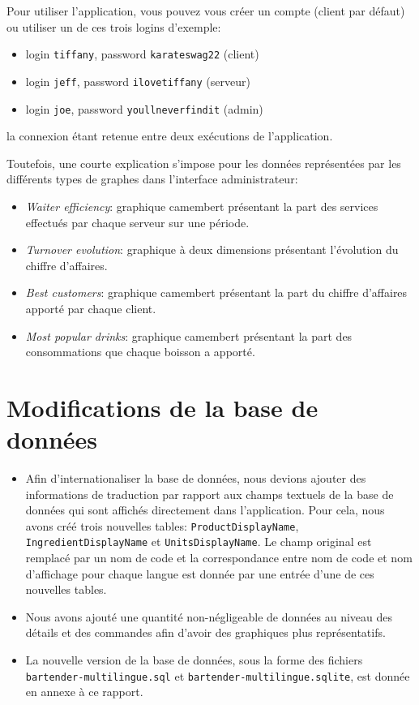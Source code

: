 \documentclass[a4paper,10pt]{article}
\begin{document}
Pour utiliser l'application, vous pouvez vous créer un compte (client par défaut) ou utiliser un de ces trois logins d'exemple:
\begin{itemize}
    \item login \texttt{tiffany}, password \texttt{karateswag22} (client)
    \item login \texttt{jeff}, password \texttt{ilovetiffany} (serveur)
    \item login \texttt{joe}, password \texttt{youllneverfindit} (admin)
\end{itemize}
la connexion étant retenue entre deux exécutions de l'application.

Toutefois, une courte explication s'impose pour les données représentées par les différents types de graphes dans l'interface administrateur:
\begin{itemize}
    \item \emph{Waiter efficiency}: graphique camembert présentant la part des services effectués par chaque serveur sur une période.
    \item \emph{Turnover evolution}: graphique à deux dimensions présentant l'évolution du chiffre d'affaires.
    \item \emph{Best customers}: graphique camembert présentant la part du chiffre d'affaires apporté par chaque client.
    \item \emph{Most popular drinks}: graphique camembert présentant la part des consommations que chaque boisson a apporté.
\end{itemize}

\section{Modifications de la base de données}

\begin{itemize}
    \item Afin d'internationaliser la base de données, nous devions ajouter des informations de traduction par rapport aux champs textuels de la base de données qui sont affichés directement dans l'application. Pour cela, nous avons créé trois nouvelles tables: \texttt{ProductDisplayName}, \texttt{IngredientDisplayName} et \texttt{UnitsDisplayName}. Le champ original est remplacé par un nom de code et la correspondance entre nom de code et nom d'affichage pour chaque langue est donnée par une entrée d'une de ces nouvelles tables.
    \item Nous avons ajouté une quantité non-négligeable de données au niveau des détails et des commandes afin d'avoir des graphiques plus représentatifs.
    \item La nouvelle version de la base de données, sous la forme des fichiers \texttt{bartender-multilingue.sql} et \texttt{bartender-multilingue.sqlite}, est donnée en annexe à ce rapport.
\end{itemize}
\end{document}
